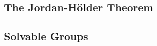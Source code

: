 \documentclass{article}
\begin{document}
\begin{multicols}{2}
    \subsection*{The Jordan-H\"older Theorem}
    
    
    
    \subsection*{Solvable Groups}
    
    
  \end{multicols}
\end{document}

